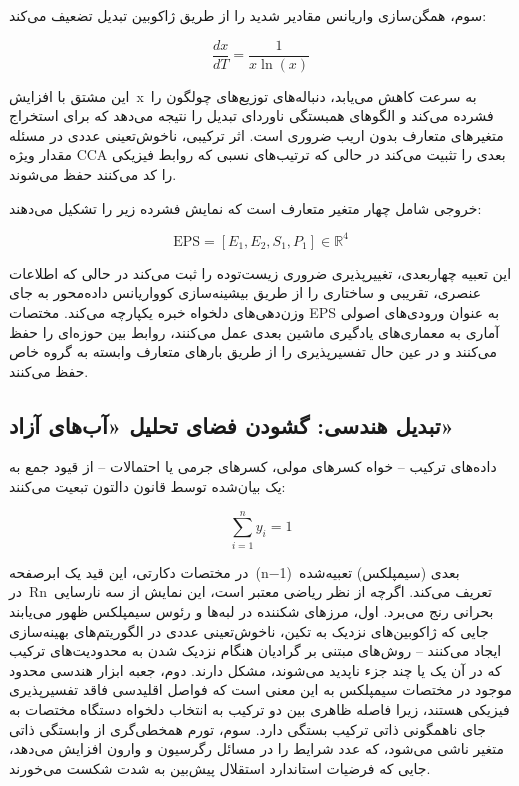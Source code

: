 \documentclass[12pt, a4paper]{article}
\begin{document}
سوم، همگن‌سازی واریانس مقادیر شدید را از طریق ژاکوبین تبدیل تضعیف می‌کند:

\begin{equation}
\frac{d x}{dT}=\frac{1}{x\ln(x)}
\end{equation}

این مشتق با افزایش x به سرعت کاهش می‌یابد، دنباله‌های توزیع‌های چولگون را فشرده می‌کند و الگوهای همبستگی ناوردای تبدیل را نتیجه می‌دهد که برای استخراج متغیرهای متعارف بدون اریب ضروری است. اثر ترکیبی، ناخوش‌تعینی عددی در مسئله مقدار ویژه CCA بعدی را تثبیت می‌کند در حالی که ترتیب‌های نسبی که روابط فیزیکی را کد می‌کنند حفظ می‌شوند.

خروجی شامل چهار متغیر متعارف است که نمایش فشرده زیر را تشکیل می‌دهند:

\begin{equation}
\mathrm{EPS}=[E_{1},E_{2},S_{1},P_{1}]\in\mathbb{R}^{4}
\end{equation}

این تعبیه چهاربعدی، تغییرپذیری ضروری زیست‌توده را ثبت می‌کند در حالی که اطلاعات عنصری، تقریبی و ساختاری را از طریق بیشینه‌سازی کوواریانس داده‌محور به جای وزن‌دهی‌های دلخواه خبره یکپارچه می‌کند. مختصات EPS به عنوان ورودی‌های اصولی آماری به معماری‌های یادگیری ماشین بعدی عمل می‌کنند، روابط بین حوزه‌ای را حفظ می‌کنند و در عین حال تفسیرپذیری را از طریق بارهای متعارف وابسته به گروه خاص حفظ می‌کنند.

\subsection{تبدیل هندسی: گشودن فضای تحلیل «آب‌های آزاد»}

داده‌های ترکیب – خواه کسرهای مولی، کسرهای جرمی یا احتمالات – از قیود جمع به یک بیان‌شده توسط قانون دالتون تبعیت می‌کنند:

\begin{equation}
\sum_{i=1}^{n} y_{i}=1
\end{equation}

در مختصات دکارتی، این قید یک ابرصفحه (n−1) بعدی (سیمپلکس) تعبیه‌شده در Rn تعریف می‌کند. اگرچه از نظر ریاضی معتبر است، این نمایش از سه نارسایی بحرانی رنج می‌برد. اول، مرزهای شکننده در لبه‌ها و رئوس سیمپلکس ظهور می‌یابند جایی که ژاکوبین‌های نزدیک به تکین، ناخوش‌تعینی عددی در الگوریتم‌های بهینه‌سازی ایجاد می‌کنند – روش‌های مبتنی بر گرادیان هنگام نزدیک شدن به محدودیت‌های ترکیب که در آن یک یا چند جزء ناپدید می‌شوند، مشکل دارند. دوم، جعبه ابزار هندسی محدود موجود در مختصات سیمپلکس به این معنی است که فواصل اقلیدسی فاقد تفسیرپذیری فیزیکی هستند، زیرا فاصله ظاهری بین دو ترکیب به انتخاب دلخواه دستگاه مختصات به جای ناهمگونی ذاتی ترکیب بستگی دارد. سوم، تورم همخطی‌گری از وابستگی ذاتی متغیر ناشی می‌شود، که عدد شرایط را در مسائل رگرسیون و وارون افزایش می‌دهد، جایی که فرضیات استاندارد استقلال پیش‌بین به شدت شکست می‌خورند.
\end{document}
